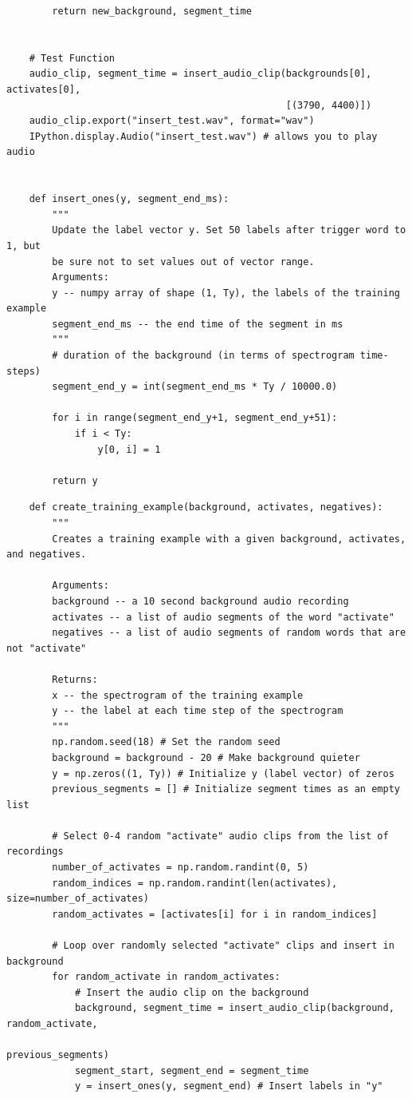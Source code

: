 \documentclass[11pt, a4paper]{article}
\begin{document}
\begin{spacing}{1.1}
\begin{lstlisting}
		return new_background, segment_time
		
	
	# Test Function
	audio_clip, segment_time = insert_audio_clip(backgrounds[0], activates[0], 
	                                             [(3790, 4400)])
	audio_clip.export("insert_test.wav", format="wav")
	IPython.display.Audio("insert_test.wav") # allows you to play audio
	
	
	def insert_ones(y, segment_end_ms):
		"""
		Update the label vector y. Set 50 labels after trigger word to 1, but
		be sure not to set values out of vector range.		
		Arguments:
		y -- numpy array of shape (1, Ty), the labels of the training example
		segment_end_ms -- the end time of the segment in ms
		"""
		# duration of the background (in terms of spectrogram time-steps)
		segment_end_y = int(segment_end_ms * Ty / 10000.0)
		
		for i in range(segment_end_y+1, segment_end_y+51):
			if i < Ty:
				y[0, i] = 1

		return y \end{lstlisting} \newpage

	\begin{lstlisting}
	def create_training_example(background, activates, negatives):
		"""
		Creates a training example with a given background, activates, and negatives.
		
		Arguments:
		background -- a 10 second background audio recording
		activates -- a list of audio segments of the word "activate"
		negatives -- a list of audio segments of random words that are not "activate"
		
		Returns:
		x -- the spectrogram of the training example
		y -- the label at each time step of the spectrogram
		"""
		np.random.seed(18) # Set the random seed
		background = background - 20 # Make background quieter
		y = np.zeros((1, Ty)) # Initialize y (label vector) of zeros
		previous_segments = [] # Initialize segment times as an empty list
		
		# Select 0-4 random "activate" audio clips from the list of recordings
		number_of_activates = np.random.randint(0, 5)
		random_indices = np.random.randint(len(activates), size=number_of_activates)
		random_activates = [activates[i] for i in random_indices]
		
		# Loop over randomly selected "activate" clips and insert in background
		for random_activate in random_activates:
			# Insert the audio clip on the background
			background, segment_time = insert_audio_clip(background, random_activate, 
			                                             previous_segments)
			segment_start, segment_end = segment_time
			y = insert_ones(y, segment_end) # Insert labels in "y"
		

\end{lstlisting}
\end{spacing}
\end{document}
